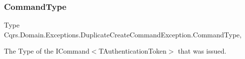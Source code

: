 \subsubsection{\texorpdfstring{Command\+Type}{CommandType}}
{\footnotesize\ttfamily Type Cqrs.\+Domain.\+Exceptions.\+Duplicate\+Create\+Command\+Exception.\+Command\+Type\hspace{0.3cm}{\ttfamily [get]}, {\ttfamily [set]}}



The Type of the I\+Command$<$\+T\+Authentication\+Token$>$ that was issued. 

